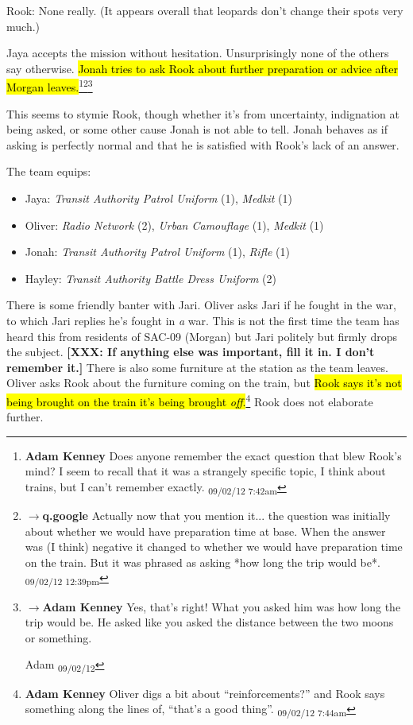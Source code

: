 Rook: None really.  (It appears overall that leopards don't change their spots very much.)



Jaya accepts the mission without hesitation.  Unsurprisingly none of the others say otherwise.  \hl{Jonah tries to ask Rook about further preparation or advice after Morgan leaves.}\footnote{\textbf{Adam Kenney }Does anyone remember the exact question that blew Rook's mind?  I seem to recall that it was a strangely specific topic, I think about trains, but I can't remember exactly. \textsubscript{09/02/12 7:42am}}\footnote{$\rightarrow$\textbf{q.google }Actually now that you mention it... the question was initially about whether we would have preparation time at base.  When the answer was (I think) negative it changed to whether we would have preparation time on the train.  But it was phrased as asking *how long the trip would be*. \textsubscript{09/02/12 12:39pm}}\footnote{$\rightarrow$\textbf{Adam Kenney }Yes, that's right!  What you asked him was how long the trip would be.  He 
asked like you asked the distance between the two moons or something. 

    Adam  \textsubscript{09/02/12}}
 
This seems to stymie Rook, though whether it's from uncertainty, indignation at being asked, or some other cause Jonah is not able to tell.   Jonah behaves as if asking is perfectly normal and that he is satisfied with Rook's lack of an answer.



The team equips:

\begin{itemize}
\item Jaya:\textit{ Transit Authority Patrol Uniform} (1),  \textit{Medkit} (1)
\item Oliver:\textit{ Radio Network} (2),\textit{ Urban Camouflage} (1),\textit{ Medkit} (1)
\item Jonah:\textit{ Transit Authority Patrol Uniform} (1),\textit{  Rifle} (1)
\item Hayley:\textit{ Transit Authority Battle Dress Uniform} (2)
\end{itemize}



There is some friendly banter with Jari.  Oliver asks Jari if he fought in the war, to which Jari replies he's fought in\textit{ a} war.  This is not the first time the team has heard this from residents of SAC-09 (Morgan) but Jari politely but firmly drops the subject.  \textbf{{[}XXX: If anything else was important, fill it in.  I don't remember it.{]}}  There is also some furniture at the station as the team leaves.  Oliver asks Rook about the furniture coming on the train, but \hl{Rook says it's not being brought on the train it's being brought\textit{ off}.}\footnote{\textbf{Adam Kenney }Oliver digs a bit about ``reinforcements?'' and Rook says something along the lines of, ``that's a good thing''. \textsubscript{09/02/12 7:44am}}  Rook does not elaborate further.



